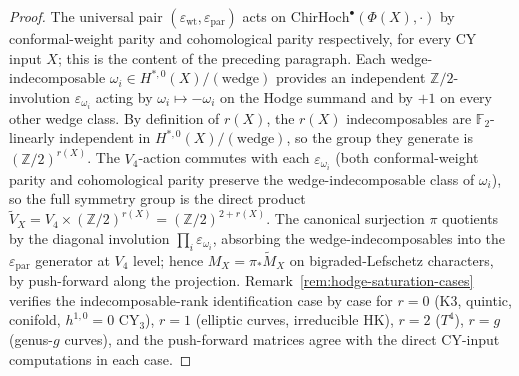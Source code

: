 \begin{proof}
The universal pair
$(\varepsilon_{\mathrm{wt}}, \varepsilon_{\mathrm{par}})$ acts on
$\mathrm{ChirHoch}^\bullet(\Phi(X), \cdot)$ by
conformal-weight parity and cohomological parity respectively, for every
CY input $X$; this is the content of the preceding paragraph. Each
wedge-indecomposable $\omega_i \in H^{*, 0}(X)/(\mathrm{wedge})$ provides an
independent $\mathbb{Z}/2$-involution $\varepsilon_{\omega_i}$ acting by
$\omega_i \mapsto -\omega_i$ on the Hodge summand and by $+1$ on every
other wedge class. By definition of $r(X)$, the $r(X)$ indecomposables are
$\mathbb{F}_2$-linearly independent in $H^{*, 0}(X)/(\mathrm{wedge})$, so
the group they generate is $(\mathbb{Z}/2)^{r(X)}$. The $V_4$-action
commutes with each $\varepsilon_{\omega_i}$ (both conformal-weight parity
and cohomological parity preserve the wedge-indecomposable class of
$\omega_i$), so the full symmetry group is the direct product
$\widetilde{V}_X = V_4 \times (\mathbb{Z}/2)^{r(X)} =
(\mathbb{Z}/2)^{2+r(X)}$. The canonical surjection $\pi$ quotients by
the diagonal involution $\prod_i \varepsilon_{\omega_i}$, absorbing the
wedge-indecomposables into the $\varepsilon_{\mathrm{par}}$ generator at
$V_4$ level; hence $M_X = \pi_*\widetilde{M}_X$ on bigraded-Lefschetz
characters, by push-forward along the projection.
Remark~\ref{rem:hodge-saturation-cases} verifies the
indecomposable-rank identification case by case for $r = 0$ (K3, quintic,
conifold, $h^{1,0}=0$ CY$_3$), $r = 1$ (elliptic curves, irreducible HK),
$r = 2$ ($T^4$), $r = g$ (genus-$g$ curves), and the push-forward
matrices agree with the direct CY-input computations in each case.
\end{proof}

